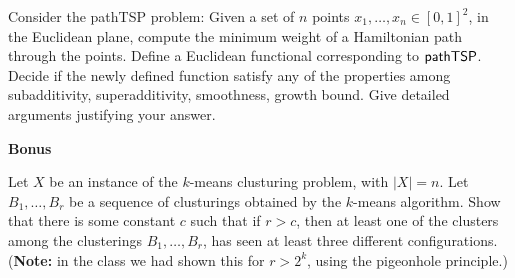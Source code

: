 \documentclass[12pt, a4paper, onecolumn]{exam}
\begin{document}
\begin{questions}
	\question[10] Consider the {\sf pathTSP} problem: Given a set of $n$ points  $x_1,\ldots, x_n \in [0,1]^2$, in the Euclidean plane, compute the minimum weight of a Hamiltonian path through the points.  Define a Euclidean functional corresponding to ${\sf pathTSP}$. Decide if the newly defined function satisfy any of the properties among  subadditivity, superadditivity, smoothness, growth bound. Give detailed arguments justifying your answer.
\end{questions}

\begin{center}
	{\bf Bonus}
\end{center}
\begin{questions}
	\question[5] Let $X$ be an instance of the $k$-means clusturing problem, with $|X| = n$. Let $B_1,\ldots, B_r$ be a sequence of clusturings obtained by the $k$-means algorithm. Show that there is some constant $c$ such that if $r>c$, then at least one of the clusters among the clusterings $B_1,\ldots, B_r$, has seen at least three different configurations. ({\bf Note:} in the class we had shown this for $r>2^k$, using the pigeonhole principle.)
\end{questions}
\end{document}

